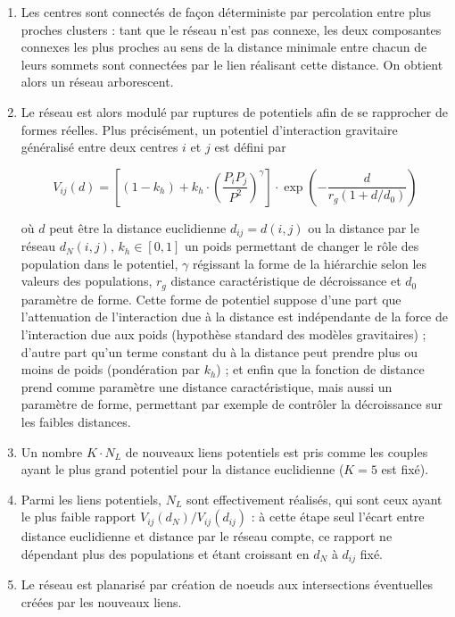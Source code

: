 {\begin{enumerate}
\item Les centres sont connectés de façon déterministe par percolation entre plus proches clusters : tant que le réseau n'est pas connexe, les deux composantes connexes les plus proches au sens de la distance minimale entre chacun de leurs sommets sont connectées par le lien réalisant cette distance. On obtient alors un réseau arborescent.
\item Le réseau est alors modulé par ruptures de potentiels afin de se rapprocher de formes réelles. Plus précisément, un potentiel d'interaction gravitaire généralisé entre deux centres $i$ et $j$ est défini par

\[
V_{ij}(d) = \left[ (1 - k_h) + k_h \cdot \left( \frac{P_i P_j}{P^2} \right)^{\gamma} \right]\cdot \exp{\left( -\frac{d}{r_g (1 + d/d_0)} \right)}
\]

où $d$ peut être la distance euclidienne $d_{ij}=d(i,j)$ ou la distance par le réseau $d_N(i,j)$, $k_h \in [0,1]$ un poids permettant de changer le rôle des population dans le potentiel, $\gamma$ régissant la forme de la hiérarchie selon les valeurs des populations, $r_g$ distance caractéristique de décroissance et $d_0$ paramètre de forme. Cette forme de potentiel suppose d'une part que l'attenuation de l'interaction due à la distance est indépendante de la force de l'interaction due aux poids (hypothèse standard des modèles gravitaires) ; d'autre part qu'un terme constant du à la distance peut prendre plus ou moins de poids (pondération par $k_h$) ; et enfin que la fonction de distance prend comme paramètre une distance caractéristique, mais aussi un paramètre de forme, permettant par exemple de contrôler la décroissance sur les faibles distances.
\item Un nombre $K\cdot N_L$ de nouveaux liens potentiels est pris comme les couples ayant le plus grand potentiel pour la distance euclidienne ($K=5$ est fixé).
\item Parmi les liens potentiels, $N_L$ sont effectivement réalisés, qui sont ceux ayant le plus faible rapport $V_{ij}(d_N)/V_{ij}(d_{ij})$ : à cette étape seul l'écart entre distance euclidienne et distance par le réseau compte, ce rapport ne dépendant plus des populations et étant croissant en $d_N$ à $d_{ij}$ fixé.
\item Le réseau est planarisé par création de noeuds aux intersections éventuelles créées par les nouveaux liens.
\end{enumerate}
}



